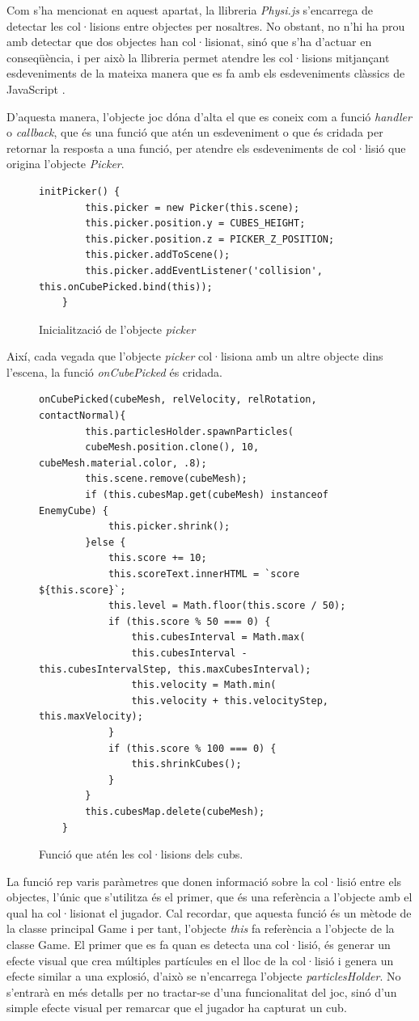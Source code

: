 \documentclass[12pt,a4paper,catalan]{article}
\begin{document}
	Com s'ha mencionat en aquest apartat, la llibreria \textit{Physi.js} s'encarrega de detectar les col·lisions entre objectes per nosaltres. No obstant, no n'hi ha prou amb detectar que dos objectes han col·lisionat, sinó que s'ha d'actuar en conseqüència, i per això la llibreria permet atendre les col·lisions mitjançant esdeveniments de la mateixa manera que es fa amb els esdeveniments clàssics de JavaScript \cite{js-event}.
	
	D'aquesta manera, l'objecte joc dóna d'alta el que es coneix com a funció \textit{handler} o \textit{callback}, que és una funció que atén un esdeveniment o que és cridada per retornar la resposta a una funció, per atendre els esdeveniments de col·lisió que origina l'objecte \textit{Picker}.
	\begin{figure}[H]
	\begin{lstlisting}[]
	initPicker() {
		this.picker = new Picker(this.scene);
		this.picker.position.y = CUBES_HEIGHT;
		this.picker.position.z = PICKER_Z_POSITION;
		this.picker.addToScene();
		this.picker.addEventListener('collision', this.onCubePicked.bind(this));
	}
	\end{lstlisting}
	\caption{Inicialització de l'objecte \textit{picker}}
	\label{fig:picker-init}
	\end{figure}
	Així, cada vegada que l'objecte \textit{picker} col·lisiona amb un altre objecte dins l'escena, la funció \textit{onCubePicked} és cridada.
	\begin{figure}[H]
	\begin{lstlisting}[]
	onCubePicked(cubeMesh, relVelocity, relRotation, contactNormal){
		this.particlesHolder.spawnParticles(
		cubeMesh.position.clone(), 10, cubeMesh.material.color, .8);
		this.scene.remove(cubeMesh);
		if (this.cubesMap.get(cubeMesh) instanceof EnemyCube) {
			this.picker.shrink();
		}else {
			this.score += 10;
			this.scoreText.innerHTML = `score ${this.score}`;
			this.level = Math.floor(this.score / 50);
			if (this.score % 50 === 0) {
				this.cubesInterval = Math.max(
				this.cubesInterval - this.cubesIntervalStep, this.maxCubesInterval);
				this.velocity = Math.min(
				this.velocity + this.velocityStep, this.maxVelocity);
			}
			if (this.score % 100 === 0) {
				this.shrinkCubes();
			}
		}
		this.cubesMap.delete(cubeMesh);
	}
	\end{lstlisting}
	\caption{Funció que atén les col·lisions dels cubs.}
	\label{fig:oncubepicked}
	\end{figure}
	La funció rep varis paràmetres que donen informació sobre la col·lisió entre els objectes, l'únic que s'utilitza és el primer, que és una referència a l'objecte amb el qual ha col·lisionat el jugador. Cal recordar, que aquesta funció és un mètode de la classe principal Game i per tant, l'objecte \textit{this} fa referència a l'objecte de la classe Game.
	El primer que es fa quan es detecta una col·lisió, és generar un efecte visual que crea múltiples partícules en el lloc de la col·lisió i genera un efecte similar a una explosió, d'això se n'encarrega l'objecte \textit{particlesHolder}. No s'entrarà en més detalls per no tractar-se d'una funcionalitat del joc, sinó d'un simple efecte visual per remarcar que el jugador ha capturat un cub.
	
\end{document}
